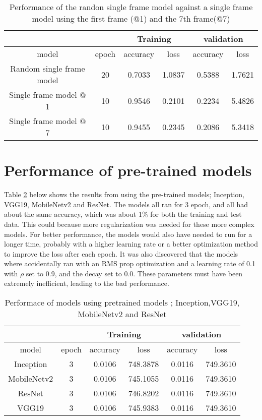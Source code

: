 \begin{table}[h!]
\centering
\begin{tabular}{ |c|c|c|c|c|c| } 
 \hline
  \multicolumn{2}{|c|}{ } &
 \multicolumn{2}{|c|}{Training } &
 \multicolumn{2}{|c|}{validation} \\
 \hline
 model & epoch & accuracy & loss & accuracy & loss \\ 
  \hline
   Random  single frame model& 20 &  0.7033 & 1.0837 & 0.5388 &1.7621\\ 
Single frame model @ 1  & 10 &   0.9546 & 0.2101 & 0.2234 & 5.4826\\ 
Single frame model @ 7  & 10 &   0.9455 & 0.2345 & 0.2086 &5.3418\\ 
 \hline
\end{tabular}
\caption{Performance of the randon single frame model against a single frame model using the first frame (@1) and the 7th frame(@7)}
\label{randomSingleFrame}
\end{table}


\section{ Performance of pre-trained models}
Table \ref{pretrained} below shows the results from using the pre-trained models; Inception, VGG19, MobileNetv2 and ResNet. The models all ran for 3 epoch, and all had about the same accuracy, which was about 1\% for both the training and test data.  This could because more regularization was needed for these more complex models. For better performance, the models would also have needed to run for a longer time, probably with a higher learning rate or a better optimization method to improve the loss after each epoch.  It was also discovered that the models where accidentally ran with an RMS prop optimization and a learning rate of  0.1 with $\rho$ set to 0.9, and the decay set to 0.0. These parameters must have been extremely inefficient, leading to the bad performance. 

\begin{table}[h!]
\centering
\begin{tabular}{ |c|c|c|c|c|c| } 
 \hline
  \multicolumn{2}{|c|}{ } &
 \multicolumn{2}{|c|}{Training } &
 \multicolumn{2}{|c|}{validation} \\
 \hline
 model & epoch & accuracy & loss & accuracy & loss \\ 
  \hline
     Inception & 3 & 0.0106 & 748.3878 & 0.0116&749.3610 \\ 
 MobileNetv2 & 3 &0.0106 &  745.1055  & 0.0116&749.3610\\
  ResNet & 3 & 0.0106 & 746.8202 & 0.0116 &749.3610  \\ 
  VGG19 & 3 &  0.0106 & 745.9383 & 0.0116 &749.3610\\
 
 \hline
\end{tabular}
\caption{Performace of models using pretrained models ; Inception,VGG19, MobileNetv2 and ResNet}
\label{pretrained}
\end{table}

